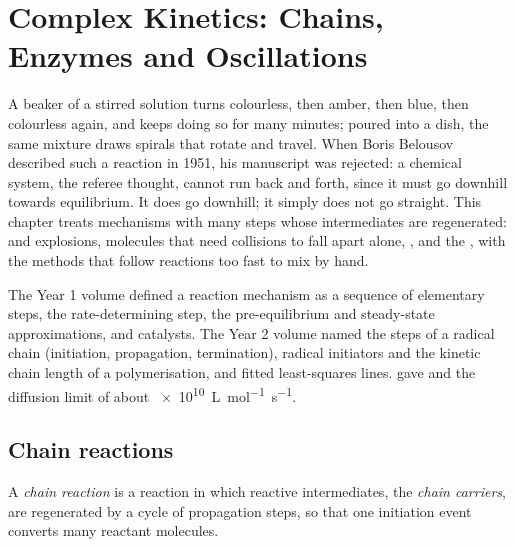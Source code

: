 \chapter{Complex Kinetics: Chains, Enzymes and Oscillations}\label{ch:b3:complex-kinetics}

A beaker of a stirred solution turns colourless, then amber, then blue, then
colourless again, and keeps doing so for many minutes; poured into a dish, the
same mixture draws spirals that rotate and travel. When Boris Belousov
described such a reaction in 1951, his manuscript was rejected: a chemical
system, the referee thought, cannot run back and forth, since it must go
downhill towards equilibrium. It does go downhill; it simply does not go
straight. This chapter treats mechanisms with many steps whose intermediates
are regenerated:  and explosions, molecules that need
collisions to fall apart alone, , and the , with
the methods that follow reactions too fast to mix by hand.

\begin{recall}
The Year 1 volume defined a reaction mechanism as a sequence of elementary
steps, the rate-determining step, the pre-equilibrium and steady-state
approximations, and catalysts. The Year 2 volume named the steps of a radical
chain (initiation, propagation, termination), radical initiators and the
kinetic chain length of a polymerisation, and fitted least-squares lines.
 gave  and the diffusion limit
of about \qty{e10}{L.mol^{-1}.s^{-1}}.
\end{recall}

\section{Chain reactions}

\begin{definition}\label{def:b3:complex-kinetics:chain}
A \emph{chain reaction} is a reaction in which reactive
intermediates, the \emph{chain carriers}, are regenerated by
a cycle of propagation steps, so that one initiation event converts many
reactant molecules.
\end{definition}

